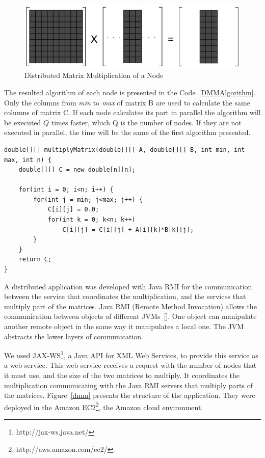 \begin{figure}[htbp]
\begin{center}
	\includegraphics[scale=0.5]{images/matrices}
\caption{Distributed Matrix Multiplication of a Node}
\label{matrices}
\end{center}
\end{figure}

The resulted algorithm of each node is presented in the Code~\ref{DMMAlgorithm}. Only the columns from \emph{min} to \emph{max} of matrix B are used to calculate the same columns of matrix C. If each node calculates its part in parallel the algorithm will be executed $Q$ times faster, which Q is the number of nodes. If they are not executed in parallel, the time will be the same of the first algorithm presented.
\clearpage

\begin{lstlisting}
double[][] multiplyMatrix(double[][] A, double[][] B, int min, int max, int n) {
	double[][] C = new double[n][n];
	
	for(int i = 0; i<n; i++) {
		for(int j = min; j<max; j++) {
			C[i][j] = 0.0;
			for(int k = 0; k<n; k++)
				C[i][j] = C[i][j] + A[i][k]*B[k][j];
		}
	}
	return C;
}
\end{lstlisting}

A distributed application was developed with Java RMI for the communication between the service that coordinates the multiplication, and the services that multiply part of the matrices. Java RMI (Remote Method Invocation) allows the communication between objects of different JVMs~[\citet{JavaRMI}]. One object can manipulate another remote object in the same way it manipulates a local one. The JVM abstracts the lower layers of communication.

We used JAX-WS\footnote{http://jax-ws.java.net/}, a Java API for XML Web Services, to provide this service as a web service.  This web service receives a request with the number of nodes that it must use, and the size of the two matrices to multiply. It coordinates the multiplication communicating with the Java RMI servers that multiply parts of the matrices. Figure~\ref{dmm} presents the structure of the application. They were deployed in the Amazon EC2\footnote{http://aws.amazon.com/ec2/}, the Amazon cloud environment.

